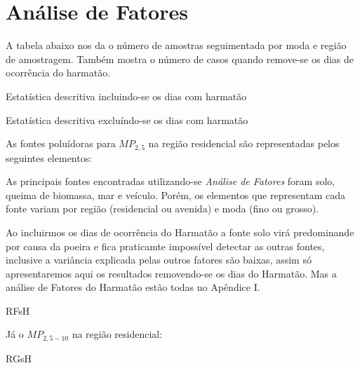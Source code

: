 \section{Análise de Fatores}

A tabela abaixo nos da o número de amostras seguimentada por
moda e região de amostragem. 
Também mostra o número de casos quando remove-se os dias de ocorrência do harmatão.

\begin{table}[H]
 \centering
  
  \caption{Estatística descritiva incluindo-se os dias com harmatão}
\end{table}

\begin{table}[H]
  \centering
  
  \caption{Estatística descritiva excluíndo-se os dias com harmatão}
\end{table}


As fontes poluídoras para $MP_{2,5}$ na região residencial são representadas 
pelos seguintes elementos:



As principais fontes encontradas utilizando-se
\textit{Análise de Fatores} foram solo, queima de biomassa, mar e veículo.
Porém, os elementos que representam cada fonte variam por região 
(residencial ou avenida) e moda (fino ou grosso). 

Ao incluirmos os dias de ocorrência do Harmatão a fonte solo
virá predominande por causa da poeira e fica praticamte impossível
detectar as outras fontes, inclusive a variância explicada pelas
outros fatores são baixas, assim só apresentaremos aqui os resultados 
removendo-se os dias do Harmatão. Mas a análise de Fatores do Harmatão
estão todas no Apêndice I.


\begin{table}[H]
  \centering
  
  \caption{RFsH}
\end{table}

Já o $MP_{2,5-10}$ na região residencial:

\begin{table}[H]
  \centering
  
  \caption{RGsH}
\end{table}

